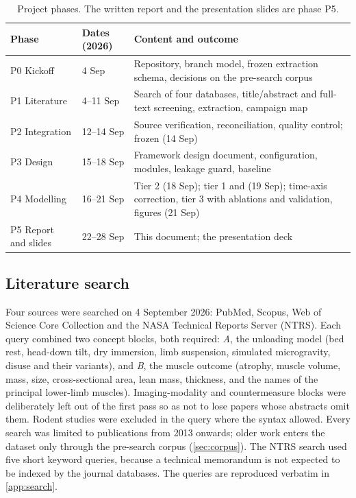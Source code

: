 \begin{table}[htbp]
\centering
\caption{Project phases. The written report and the presentation slides are phase P5.}
\label{tab:phases}
\small
\begin{tabularx}{\linewidth}{@{}l l Y@{}}
\toprule
Phase & Dates (2026) & Content and outcome \\
\midrule
P0 Kickoff & 4 Sep & Repository, branch model, frozen extraction schema, decisions on the pre-search corpus \\
P1 Literature & 4--11 Sep & Search of four databases, title/abstract and full-text screening, extraction, campaign map \\
P2 Integration & 12--14 Sep & Source verification, reconciliation, quality control;  frozen (14 Sep) \\
P3 Design & 15--18 Sep & Framework design document, configuration, modules, leakage guard, baseline \\
P4 Modelling & 16--21 Sep & Tier 2 (18 Sep); tier 1 and  (19 Sep); time-axis correction, tier 3 with ablations and validation, figures (21 Sep) \\
P5 Report and slides & 22--28 Sep & This document; the presentation deck \\
\bottomrule
\end{tabularx}
\end{table}

\subsection{Literature search}
\label{sec:search}

Four sources were searched on 4 September 2026: PubMed, Scopus, Web of Science Core Collection and the NASA
Technical Reports Server (NTRS). Each query combined two concept blocks, both required: \emph{A}, the unloading
model (bed rest, head-down tilt, dry immersion, limb suspension, simulated microgravity, disuse and their
variants), and \emph{B}, the muscle outcome (atrophy, muscle volume, mass, size, cross-sectional area, lean mass,
thickness, and the names of the principal lower-limb muscles). Imaging-modality and countermeasure blocks were
deliberately left out of the first pass so as not to lose papers whose abstracts omit them. Rodent studies were
excluded in the query where the syntax allowed. Every search was limited to publications from 2013 onwards; older
work enters the dataset only through the pre-search corpus (\cref{sec:corpus}). The NTRS search used five short
keyword queries, because a technical memorandum is not expected to be indexed by the journal databases. The
queries are reproduced verbatim in \cref{app:search}.

